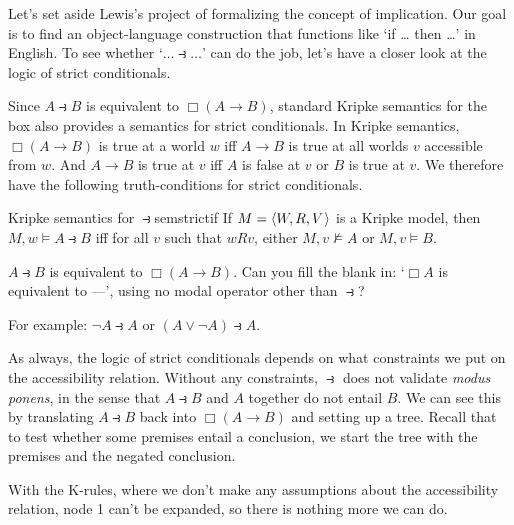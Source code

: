 Let's set aside Lewis's project of formalizing the concept of implication. Our
goal is to find an object-language construction that functions like `if \ldots
then \ldots' in English. To see whether `$\ldots \strictif\ldots$' can do the job,
let's have a closer look at the logic of strict conditionals.

Since $A \strictif B$ is equivalent to $\Box(A \to B)$, standard Kripke
semantics for the box also provides a semantics for strict conditionals. In
Kripke semantics, $\Box(A \to B)$ is true at a world $w$ iff $A \to B$ is true
at all worlds $v$ accessible from $w$. And $A \to B$ is true at $v$ iff 
$A$ is false at $v$ or $B$ is true at $v$. We therefore have the following
truth-conditions for strict conditionals.

\begin{definition}{Kripke semantics for $\strictif$}{semstrictif}
  If $M = \t{W,R,V}$ is a Kripke model, then\\[1mm]
  $M,w \models A \strictif B$ iff for all $v$ such that $wRv$, either
  $M,v \not\models A$ or $M,v \models B$.
\end{definition}

\begin{exercise}
  $A \strictif B$ is equivalent to $\Box(A \to B)$. Can you fill the blank in:
  `$\Box A$ is equivalent to ---', using no modal operator other than
  $\strictif$?
\end{exercise}
\begin{solution}
  For example: $\neg A \strictif A$ or $(A\lor \neg A) \strictif A$.
\end{solution}

As always, the logic of strict conditionals depends on what constraints we
put on the accessibility relation. Without any constraints, $\strictif$ does
not validate \emph{modus ponens}, in the sense that $A \strictif B$ and $A$
together do not entail $B$. We can see this by translating
$A \strictif B$ back into $\Box(A \to B)$ and setting up a tree. Recall that to
test whether some premises entail a conclusion, we start the tree with the
premises and the negated conclusion.
%
\begin{center}
\end{center}
%
With the K-rules, where we don't make any assumptions about the accessibility
relation, node 1 can't be expanded, so there is nothing more we can do.

